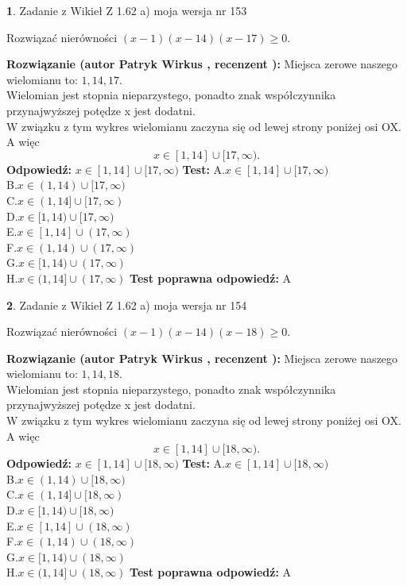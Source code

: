 \documentclass[12pt, a4paper]{article}
\theoremstyle{definition} %
\newtheorem{zad}{}
\newcommand{\zadStart}[1]{\begin{zad}#1\newline}
\newcommand{\zadStop}{\end{zad}}
\newcommand{\rozwStart}[2]{\noindent \textbf{Rozwiązanie (autor #1 , recenzent #2): }\newline}
\newcommand{\rozwStop}{\newline}
\newcommand{\odpStart}{\noindent \textbf{Odpowiedź:}\newline}
\newcommand{\odpStop}{\newline}
\newcommand{\testStart}{\noindent \textbf{Test:}\newline}
\newcommand{\testStop}{\newline}
\newcommand{\kluczStart}{\noindent \textbf{Test poprawna odpowiedź:}\newline}
\newcommand{\kluczStop}{\newline}
\begin{document}
\zadStart{Zadanie z Wikieł Z 1.62 a) moja wersja nr 153}

Rozwiązać nierówności $(x-1)(x-14)(x-17)\ge0$.
\zadStop
\rozwStart{Patryk Wirkus}{}
Miejsca zerowe naszego wielomianu to: $1, 14, 17$.\\
Wielomian jest stopnia nieparzystego, ponadto znak współczynnika przy\linebreak najwyższej potędze x jest dodatni.\\ W związku z tym wykres wielomianu zaczyna się od lewej strony poniżej osi OX. A więc $$x \in [1,14] \cup [17,\infty).$$
\rozwStop
\odpStart
$x \in [1,14] \cup [17,\infty)$
\odpStop
\testStart
A.$x \in [1,14] \cup [17,\infty)$\\
B.$x \in (1,14) \cup [17,\infty)$\\
C.$x \in (1,14] \cup [17,\infty)$\\
D.$x \in [1,14) \cup [17,\infty)$\\
E.$x \in [1,14] \cup (17,\infty)$\\
F.$x \in (1,14) \cup (17,\infty)$\\
G.$x \in [1,14) \cup (17,\infty)$\\
H.$x \in (1,14] \cup (17,\infty)$
\testStop
\kluczStart
A
\kluczStop



\zadStart{Zadanie z Wikieł Z 1.62 a) moja wersja nr 154}

Rozwiązać nierówności $(x-1)(x-14)(x-18)\ge0$.
\zadStop
\rozwStart{Patryk Wirkus}{}
Miejsca zerowe naszego wielomianu to: $1, 14, 18$.\\
Wielomian jest stopnia nieparzystego, ponadto znak współczynnika przy\linebreak najwyższej potędze x jest dodatni.\\ W związku z tym wykres wielomianu zaczyna się od lewej strony poniżej osi OX. A więc $$x \in [1,14] \cup [18,\infty).$$
\rozwStop
\odpStart
$x \in [1,14] \cup [18,\infty)$
\odpStop
\testStart
A.$x \in [1,14] \cup [18,\infty)$\\
B.$x \in (1,14) \cup [18,\infty)$\\
C.$x \in (1,14] \cup [18,\infty)$\\
D.$x \in [1,14) \cup [18,\infty)$\\
E.$x \in [1,14] \cup (18,\infty)$\\
F.$x \in (1,14) \cup (18,\infty)$\\
G.$x \in [1,14) \cup (18,\infty)$\\
H.$x \in (1,14] \cup (18,\infty)$
\testStop
\kluczStart
A
\kluczStop
\end{document}

